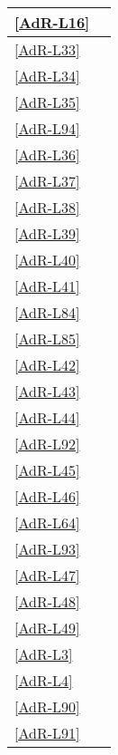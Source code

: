 \begin{longtable}{|P{6cm}|P{6cm}|}
	\hline \ref{AdR-L16} &  \\ %
	\hline \ref{AdR-L33} &  \\
	\hline \ref{AdR-L34} &  \\
	\hline \ref{AdR-L35} &  \\
	\hline \ref{AdR-L94} &  \linebreak {} \\
	\hline \ref{AdR-L36} &  \\ %
	\hline \ref{AdR-L37} &  \\
	\hline \ref{AdR-L38} &  \\
	\hline \ref{AdR-L39} &  \\
	\hline \ref{AdR-L40} &  \\
	\hline \ref{AdR-L41} &  \\ %
	\hline \ref{AdR-L84} &  \\
	\hline \ref{AdR-L85} &  \\
	\hline \ref{AdR-L42} &  \\
 	\hline \ref{AdR-L43} &  \\
	\hline \ref{AdR-L44} &  \\ %
	\hline \ref{AdR-L92} &  \\
	\hline \ref{AdR-L45} &  \\
	\hline \ref{AdR-L46} &  \\
	\hline \ref{AdR-L64} &  \\
	\hline \ref{AdR-L93} &  \\ %
	\hline \ref{AdR-L47} &  \\
	\hline \ref{AdR-L48} &  \\
	\hline \ref{AdR-L49} &  \\
	\hline \ref{AdR-L3} &  \\
	\hline \ref{AdR-L4} &  \\ %
	\hline \ref{AdR-L90} &  \\
	\hline \ref{AdR-L91} &  \\ %
	

\end{longtable}
